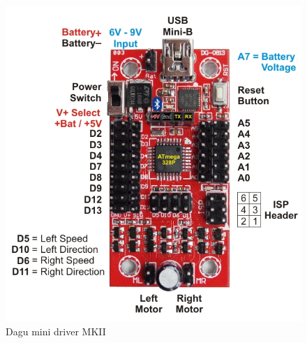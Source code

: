 \documentclass[12pt,a4paper]{report}
\begin{document}
\begin{figure}[htbp]
\begin{minipage}[c]{.45\linewidth}
\begin{center}
\includegraphics[scale=1]{images/Mini_Driver_MkII.jpg}
\caption{Dagu mini driver MKII}
\end{center}
\end{minipage}
\end{figure}

%
%
%
%
%
%
%
\end{document}
